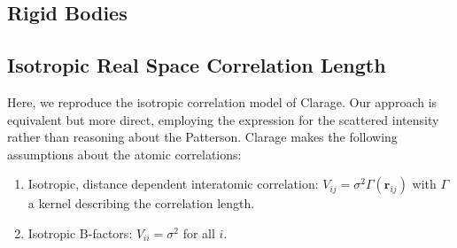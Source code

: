 \documentclass{article}
\begin{document}
\subsection{Rigid Bodies}


\subsection{Isotropic Real Space Correlation Length}
Here, we reproduce the isotropic correlation model of Clarage. Our approach is equivalent but more direct, employing the expression for the scattered intensity rather than reasoning about the Patterson. Clarage makes the following assumptions about the atomic correlations:
%
\begin{enumerate}

\item Isotropic, distance dependent interatomic correlation: 
$V_{ij} = \sigma^2 \Gamma(\mathbf{r}_{ij}) $ with $\Gamma$ a kernel describing the correlation length.

\item Isotropic B-factors: $V_{ii} = \sigma^2$ for all $i$.

\end{enumerate}
\end{document}

